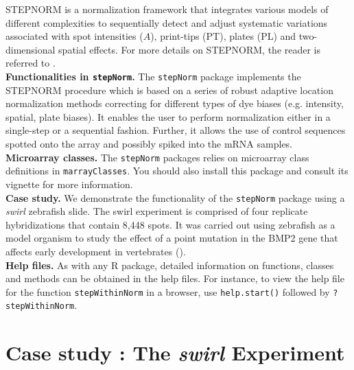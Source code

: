 \documentclass[11pt]{article}
\newcommand{\code}[1]{{\tt #1}}
\newcommand{\Rfunc}[1]{{\tt #1}}
\begin{document}
STEPNORM is a normalization framework that integrates various models of different 
complexities to sequentially detect and adjust systematic variations associated with spot 
intensities ($A$), print-tips (PT), plates (PL) and two-dimensional spatial effects. 
For more details on STEPNORM, the reader is referred to \cite{stepNorm}. \\

{\bf Functionalities in \code{stepNorm}.} The \code{stepNorm} package implements the 
STEPNORM procedure which is based on a series of robust adaptive location normalization 
methods correcting for different types of dye biases (e.g. intensity, spatial, plate biases).
It enables the user to perform normalization either in a single-step or a sequential
fashion. Further, it allows the use of control sequences spotted onto the array and 
possibly spiked into the mRNA samples.\\

{\bf Microarray classes.} The \code{stepNorm} packages relies on microarray class definitions in 
{\tt marrayClasses}. You should also install this package and consult its vignette for more information.\\

{\bf Case study.} We demonstrate the functionality of the {\tt stepNorm} package using 
a \emph{swirl} zebrafish slide. The swirl experiment is comprised of four replicate 
hybridizations that contain 8,448 spots. It was carried out using zebrafish as a model 
organism to study the effect of a point mutation in the BMP2 gene that affects early 
development in vertebrates (\cite{NormNAR}). \\

{\bf Help files.}  As with any R package, detailed information on functions, classes and 
methods can be obtained in the help files. For instance, to view the help file for the 
function \Rfunc{stepWithinNorm} in a browser, use \code{help.start()} followed by 
\code{?stepWithinNorm}.\\


\section{Case study : The \emph{swirl} Experiment}
\end{document}
